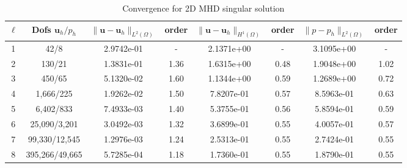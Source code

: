 \documentclass{article}
\newcommand{\uu}[1]{\boldsymbol #1}                     %
\begin{document}
\begin{table}[h!] \small
\begin{center}
\begin{tabular}{cccccccc}
\hline
$\ell$ &    Dofs $\uu{u}_h/p_h$ & $\|\uu{u}-\uu{u}_h\|_{L^2(\Omega)}$ & order & $\|\uu{u}-\uu{u}_h\|_{H^1(\Omega)}$ & order &$\|{p}-{p}_h\|_{L^2(\Omega)}$ & order  \\
\hline
  1 &     42/8 &  2.9742e-01 & - & 2.1371e+00 & - &  3.1095e+00 &      - \\
  2 &    130/21 &  1.3831e-01 & 1.36 & 1.6315e+00 & 0.48 &  1.9048e+00 &      1.02 \\
  3 &    450/65 &  5.1320e-02 & 1.60 & 1.1344e+00 & 0.59 &  1.2689e+00 &      0.72 \\
  4 &   1,666/225 &  1.9262e-02 & 1.50 & 7.8207e-01 & 0.57 &  8.5963e-01 &      0.63 \\
  5 &   6,402/833 &  7.4933e-03 & 1.40 & 5.3755e-01 & 0.56 &  5.8594e-01 &      0.59 \\
  6 &  25,090/3,201 &  3.0492e-03 & 1.32 & 3.6899e-01 & 0.55 &  4.0057e-01 &      0.57 \\
  7 &  99,330/12,545 &  1.2976e-03 & 1.24 & 2.5313e-01 & 0.55 &  2.7424e-01 &      0.55 \\
  8 &  395,266/49,665 &  5.7285e-04 &     1.18 &  1.7360e-01 &     0.55 &  1.8790e-01 &      0.55 \\

\hline
\end{tabular}
\caption{Convergence for 2D MHD singular solution}
\label{tab:MHD_2D_smooth_fluids_velocity}
\end{center}
\end{table}
\end{document}

